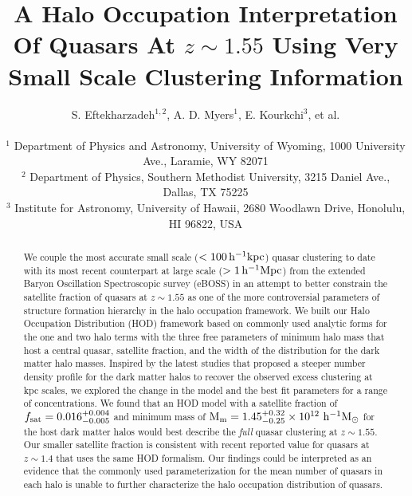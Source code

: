 \documentclass[useAMS,usenatbib]{mn2e}
\begin{document}

\title[Quasar HOD at $z \sim 1.5$]{A Halo Occupation Interpretation Of Quasars At $z\sim1.55$ Using Very Small Scale Clustering Information}
% 
\author[Eftekharzadeh et al.]{S. Eftekharzadeh$^{1,2}$,  A. D. Myers$^{1}$, E. Kourkchi$^{3}$, et al.\\
\\
$^{1}$ Department of Physics and Astronomy, University of Wyoming, 1000 University Ave., Laramie, WY 82071\\
$^{2}$ Department of Physics, Southern Methodist University, 3215 Daniel Ave., Dallas, TX 75225\\
$^{3}$ Institute for Astronomy, University of Hawaii, 2680 Woodlawn Drive, Honolulu, HI 96822, USA}
\maketitle


\begin{abstract}
We couple the most accurate small scale ($< 100\, \rm h^{-1}kpc$) quasar clustering 
to date with its most recent counterpart at large scale ($> 1\, \rm h^{-1}Mpc$) 
from the extended Baryon Oscillation Spectroscopic survey (eBOSS) in an attempt 
to better constrain the satellite fraction of quasars at $z\sim 1.55$ as one of the more controversial 
parameters of structure formation hierarchy in the halo occupation framework. 
We built our Halo Occupation Distribution (HOD) framework based on commonly 
used analytic forms for the one and two halo terms with the three free 
parameters of minimum halo mass that host a central quasar, satellite fraction, 
and the width of the distribution for the dark matter halo masses. Inspired by 
the latest studies that proposed a steeper number density profile for the dark 
matter halos to recover the observed excess clustering at kpc scales, we 
explored the change in the model and the best fit parameters for a range of 
concentrations. We found that an HOD model with a satellite fraction of $f_{\rm 
sat} = 0.016_{-0.005}^{+0.004}$ and minimum mass of $\rm M_{m} = 
1.45_{-0.25}^{+0.32} \times 10^{12}\, \, \rm h^{-1} M_{\odot}$ for the host dark matter 
halos would best describe the {\it full} quasar clustering at $z \sim 1.55$. Our 
smaller satellite fraction is consistent with recent reported value for 
quasars at $z\sim 1.4$ that uses the same HOD formalism. Our findings could be interpreted as an evidence that the commonly used parameterization for the mean number of quasars in each 
halo is unable to further characterize the halo occupation distribution of 
quasars.   



\end{abstract}
\end{document}
